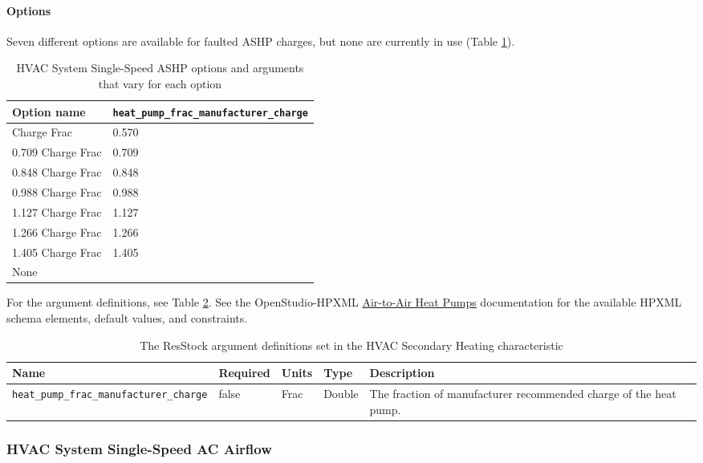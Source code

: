 \paragraph{Options}
Seven different options are available for faulted ASHP charges, but none are currently in use (Table \ref{table:hc_opt_ss_hp_charge}).

\begin{longtable}[]{|p{3.5cm}|p{8cm}|}\caption{HVAC System Single-Speed ASHP options and arguments that vary for each option} \label{table:hc_opt_ss_hp_charge} \\
\toprule\noalign{}
Option name &
\texttt{heat\_pump\_frac\_manufacturer\_charge} \\
\midrule\noalign{}
\endhead
\bottomrule\noalign{}
\endlastfoot
0.570 Charge Frac & 0.570 \\
0.709 Charge Frac & 0.709 \\
0.848 Charge Frac & 0.848 \\
0.988 Charge Frac & 0.988 \\
1.127 Charge Frac & 1.127 \\
1.266 Charge Frac & 1.266 \\
1.405 Charge Frac & 1.405 \\
None & \\
\end{longtable}
For the argument definitions, see Table \ref{table:hc_arg_def_ss_hp_charge}. See the OpenStudio-HPXML \href{https://openstudio-hpxml.readthedocs.io/en/v1.8.1/workflow_inputs.html#air-to-air-heat-pump}{Air-to-Air Heat Pumps} documentation for the available HPXML schema elements, default values, and constraints.
\begin{longtable}[]{|p{3.5cm}|p{1.5cm}|p{1.3cm}|p{1.1cm}|p{3.5cm}|}\caption{The ResStock argument definitions set in the HVAC Secondary Heating characteristic} \label{table:hc_arg_def_ss_hp_charge}\\
\toprule\noalign{}
Name & Required & Units & Type &  Description \\
\midrule\noalign{}
\endhead
\bottomrule\noalign{}
\endlastfoot
\texttt{heat\_pump\_frac\_manufacturer\_charge} & false & Frac & Double
& The fraction of manufacturer recommended charge of the heat pump. \\
\end{longtable}

\subsubsection{HVAC System Single-Speed AC Airflow}

